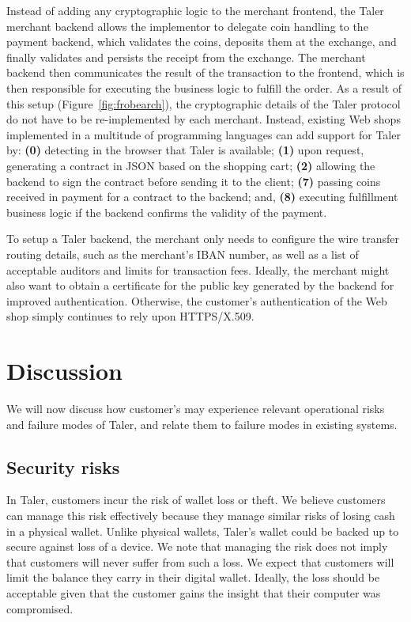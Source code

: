 \documentclass{llncs}
\begin{document}
Instead of adding any cryptographic logic to the merchant frontend,
the Taler merchant backend allows the implementor to delegate
coin handling to the payment backend, which validates the coins,
deposits them at the exchange, and finally validates and persists the
receipt from the exchange.  The merchant backend then communicates the
result of the transaction to the front\-end, which is then responsible
for executing the business logic to fulfill the order.  As a result of
this setup (Figure~\ref{fig:frobearch}), the cryptographic details
of the Taler protocol do not have to be re-implemented by each
merchant.  Instead, existing Web shops implemented in a multitude of
programming languages can add support for Taler by:
{\bf (0)} detecting in the browser that Taler is available; {\bf (1)}
upon request, generating a contract in JSON based on the shopping
cart; {\bf (2)} allowing the backend to sign the contract before
sending it to the client; {\bf (7)} passing coins received in payment
for a contract to the backend; and, {\bf (8)} executing fulfillment
business logic if the backend confirms the validity of the payment.

To setup a Taler backend, the merchant only needs to configure the
wire transfer routing details, such as the merchant's IBAN number, as
well as a list of acceptable auditors and limits for transaction fees.
Ideally, the merchant might also want to obtain a certificate for the
public key generated by the backend for improved authentication.
Otherwise, the customer's authentication of the Web shop simply
continues to rely upon HTTPS/X.509.


\section{Discussion}

We will now discuss how customer's may experience relevant operational
risks and failure modes of Taler, and relate them to failure modes
in existing systems.

\subsection{Security risks}

In Taler, customers incur the risk of wallet loss or theft.  We
believe customers can manage this risk effectively because they manage
similar risks of losing cash in a physical wallet.  Unlike physical
wallets, Taler's wallet could be backed up to secure against loss of a
device.  We note that managing the risk does not imply that customers
will never suffer from such a loss.  We expect that customers will
limit the balance they carry in their digital wallet.  Ideally, the
loss should be acceptable given that the customer gains the insight
that their computer was compromised.
\end{document}
